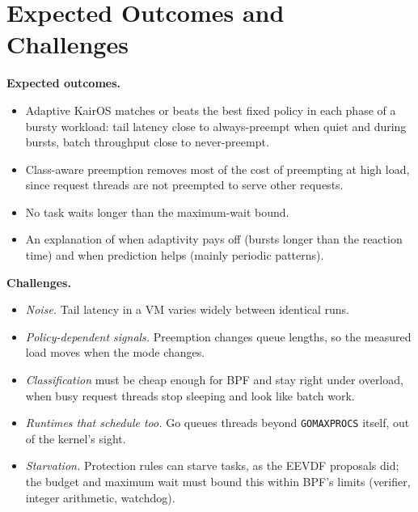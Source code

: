 \documentclass[letterpaper,twocolumn,10pt]{article}
\begin{document}
\section{Expected Outcomes and Challenges}

\textbf{Expected outcomes.}
\begin{itemize}
\item Adaptive KairOS matches or beats the best fixed policy in each phase
  of a bursty workload: tail latency close to always-preempt when quiet and
  during bursts, batch throughput close to never-preempt.
\item Class-aware preemption removes most of the cost of preempting at high
  load, since request threads are not preempted to serve other requests.
\item No task waits longer than the maximum-wait bound.
\item An explanation of when adaptivity pays off (bursts longer than the
  reaction time) and when prediction helps (mainly periodic patterns).
\end{itemize}

\textbf{Challenges.}
\begin{itemize}
\item \emph{Noise.} Tail latency in a VM varies widely between identical
  runs.
\item \emph{Policy-dependent signals.} Preemption changes queue lengths,
  so the measured load moves when the mode changes.
\item \emph{Classification} must be cheap enough for BPF and stay right
  under overload, when busy request threads stop sleeping and look like
  batch work.
\item \emph{Runtimes that schedule too.} Go queues threads beyond
  \texttt{GOMAXPROCS} itself, out of the kernel's sight.
\item \emph{Starvation.} Protection rules can starve tasks, as the EEVDF
  proposals did; the budget and maximum wait must bound this within BPF's
  limits (verifier, integer arithmetic, watchdog).
\end{itemize}
\end{document}
